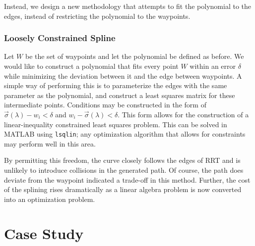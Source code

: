 \documentclass[oneside, 11pt]{book}
\begin{document}
Instead, we design a new methodology that attempts to fit the polynomial to the edges, instead of restricting the polynomial to the waypoints.

\subsection{Loosely Constrained Spline}\label{sec:restrictpolyfit}
Let $W$ be the set of waypoints and let the polynomial be defined as before. We would like to construct a polynomial that fits every point $W$ within an error $\delta$ while minimizing the deviation between it and the edge between waypoints. A simple way of performing this is to parameterize the edges with the same parameter as the polynomial, and construct a least squares matrix for these intermediate points. Conditions may be constructed in the form of $\vec{\sigma}(\lambda) - w_i < \delta$ and $w_i - \vec{\sigma}(\lambda) < \delta$. This form allows for the construction of a linear-inequality constrained least squares problem. This can be solved in MATLAB using \texttt{lsqlin}; any optimization algorithm that allows for constraints may perform well in this area.

By permitting this freedom, the curve closely follows the edges of RRT and is unlikely to introduce collisions in the generated path. Of course, the path does deviate from the waypoint indicated a trade-off in this method. Further, the cost of the splining rises dramatically as a linear algebra problem is now converted into an optimization problem.

\chapter{Case Study}
\end{document}
